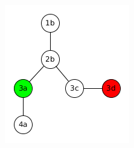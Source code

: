 \documentclass{article}
\begin{document}
\begin{figure}[htb!]
	\centering
	\begin{subfigure}{0.22\textwidth}
		\includegraphics[width=\linewidth]{small_DNA_graph_bfs1.png}

		\vspace{0.2cm}


\end{subfigure}
\end{figure}
\end{document}
